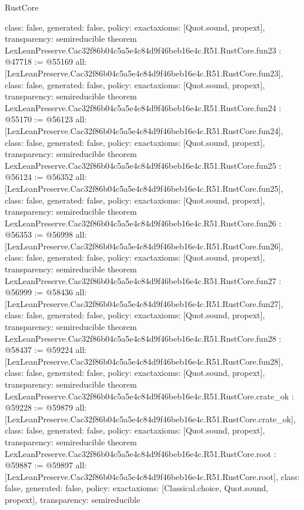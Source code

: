 \begin{lexlean}{RustCore}
\begin{coremodule}
{  class: false,
  generated: false,
  policy: exact{axioms: [Quot.sound, propext]},
  transparency: semireducible
}
theorem LexLeanPreserve.Cac32f86b04c5a5e4c84d9f46beb16e4c.R51.RustCore.fun23 : @47718 := @55169 {
  all: [LexLeanPreserve.Cac32f86b04c5a5e4c84d9f46beb16e4c.R51.RustCore.fun23],
  class: false,
  generated: false,
  policy: exact{axioms: [Quot.sound, propext]},
  transparency: semireducible
}
theorem LexLeanPreserve.Cac32f86b04c5a5e4c84d9f46beb16e4c.R51.RustCore.fun24 : @55170 := @56123 {
  all: [LexLeanPreserve.Cac32f86b04c5a5e4c84d9f46beb16e4c.R51.RustCore.fun24],
  class: false,
  generated: false,
  policy: exact{axioms: [Quot.sound, propext]},
  transparency: semireducible
}
theorem LexLeanPreserve.Cac32f86b04c5a5e4c84d9f46beb16e4c.R51.RustCore.fun25 : @56124 := @56352 {
  all: [LexLeanPreserve.Cac32f86b04c5a5e4c84d9f46beb16e4c.R51.RustCore.fun25],
  class: false,
  generated: false,
  policy: exact{axioms: [Quot.sound, propext]},
  transparency: semireducible
}
theorem LexLeanPreserve.Cac32f86b04c5a5e4c84d9f46beb16e4c.R51.RustCore.fun26 : @56353 := @56998 {
  all: [LexLeanPreserve.Cac32f86b04c5a5e4c84d9f46beb16e4c.R51.RustCore.fun26],
  class: false,
  generated: false,
  policy: exact{axioms: [Quot.sound, propext]},
  transparency: semireducible
}
theorem LexLeanPreserve.Cac32f86b04c5a5e4c84d9f46beb16e4c.R51.RustCore.fun27 : @56999 := @58436 {
  all: [LexLeanPreserve.Cac32f86b04c5a5e4c84d9f46beb16e4c.R51.RustCore.fun27],
  class: false,
  generated: false,
  policy: exact{axioms: [Quot.sound, propext]},
  transparency: semireducible
}
theorem LexLeanPreserve.Cac32f86b04c5a5e4c84d9f46beb16e4c.R51.RustCore.fun28 : @58437 := @59224 {
  all: [LexLeanPreserve.Cac32f86b04c5a5e4c84d9f46beb16e4c.R51.RustCore.fun28],
  class: false,
  generated: false,
  policy: exact{axioms: [Quot.sound, propext]},
  transparency: semireducible
}
theorem LexLeanPreserve.Cac32f86b04c5a5e4c84d9f46beb16e4c.R51.RustCore.crate_ok : @59228 := @59879 {
  all: [LexLeanPreserve.Cac32f86b04c5a5e4c84d9f46beb16e4c.R51.RustCore.crate_ok],
  class: false,
  generated: false,
  policy: exact{axioms: [Quot.sound, propext]},
  transparency: semireducible
}
theorem LexLeanPreserve.Cac32f86b04c5a5e4c84d9f46beb16e4c.R51.RustCore.root : @59887 := @59897 {
  all: [LexLeanPreserve.Cac32f86b04c5a5e4c84d9f46beb16e4c.R51.RustCore.root],
  class: false,
  generated: false,
  policy: exact{axioms: [Classical.choice, Quot.sound, propext]},
  transparency: semireducible
}


\end{coremodule}
\end{lexlean}
